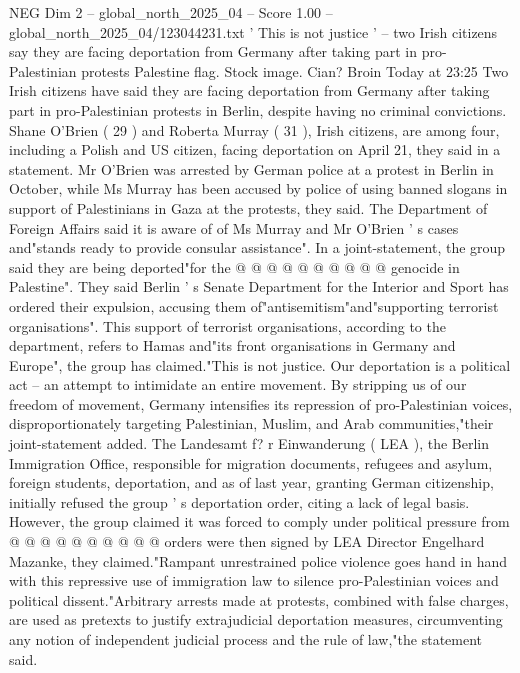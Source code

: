 \begin{textsample}{NEG Dim 2 – global\_north\_2025\_04 – Score 1.00 – global\_north\_2025\_04/123044231.txt}  \label{ex:f2_neg_124}
' This is not justice ' -- two Irish citizens say they are facing deportation from Germany after taking part in pro-Palestinian protests Palestine flag.
Stock image.
Cian?
Broin Today at 23:25 Two Irish citizens have said they are facing deportation from Germany after taking part in pro-Palestinian protests in Berlin, despite having no criminal convictions.
Shane O'Brien ( 29 ) and Roberta Murray ( 31 ), Irish citizens, are among four, including a Polish and US citizen, facing deportation on April 21, they said in a statement.
Mr O'Brien was arrested by German police at a protest in Berlin in October, while Ms Murray has been accused by police of using banned slogans in support of Palestinians in Gaza at the protests, they said.
The Department of Foreign Affairs said it is aware of of Ms Murray and Mr O'Brien ' s cases and"stands ready to provide consular assistance".
In a joint-statement, the group said they are being deported"for the @ @ @ @ @ @ @ @ @ @ genocide in Palestine".
They said Berlin ' s Senate Department for the Interior and Sport has ordered their expulsion, accusing them of"antisemitism"and"supporting terrorist organisations".
This support of terrorist organisations, according to the department, refers to Hamas and"its front organisations in Germany and Europe", the group has claimed."This is not justice.
Our deportation is a political act -- an attempt to intimidate an entire movement.
By stripping us of our freedom of movement, Germany intensifies its repression of pro-Palestinian voices, disproportionately targeting Palestinian, Muslim, and Arab communities,"their joint-statement added.
The Landesamt f? r Einwanderung ( LEA ), the Berlin Immigration Office, responsible for migration documents, refugees and asylum, foreign students, deportation, and as of last year, granting German citizenship, initially refused the group ' s deportation order, citing a lack of legal basis.
However, the group claimed it was forced to comply under political pressure from @ @ @ @ @ @ @ @ @ @ orders were then signed by LEA Director Engelhard Mazanke, they claimed."Rampant unrestrained police violence goes hand in hand with this repressive use of immigration law to silence pro-Palestinian voices and political dissent."Arbitrary arrests made at protests, combined with false charges, are used as pretexts to justify extrajudicial deportation measures, circumventing any notion of independent judicial process and the rule of law,"the statement said.

\end{textsample}
